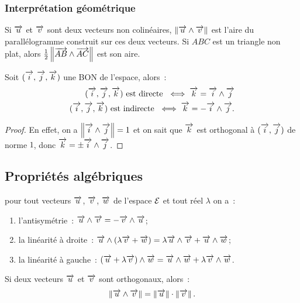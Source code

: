 \subsubsection{Interprétation géométrique}

Si \(\vu\) et \(\vv\) sont deux vecteurs non colinéaires, 
\(\norme{\vu\wedge\vv}\) est l'aire du parallélogramme construit sur ces deux 
vecteurs. Si \(ABC\) est un triangle non plat, alors 
\(\frac{1}{2}\norme{\vect{AB}\wedge\vect{AC}}\) est son aire.
\begin{prop}
  Soit \(\bondtrois\) une BON de l'espace, alors~:
  \begin{align}
    \bondtrois\text{~est directe~}\iff \vk = \vi\wedge\vj\\
    \bondtrois\text{~est indirecte~}\iff \vk = -\vi\wedge\vj.
  \end{align}
\end{prop}

\begin{proof}
  En effet, on a \(\norme{\vi\wedge\vj} = 1\) et on sait que \(\vk\) est 
  orthogonal à \((\vi, \vj)\) de norme \(1\), donc \(\vk = \pm\vi\wedge\vj\).
\end{proof}

\subsection{Propriétés algébriques}

\begin{prop}
  pour tout vecteurs \(\vu\), \(\vv\), \(\vw\) de l'espace \(\E\) et tout réel 
  \(\lambda\) on a~:
  \begin{enumerate}
    \item l'antisymétrie~: \(\vu\wedge\vv = -\vv\wedge\vu\);
    \item la linéarité à droite~: \(\vu\wedge(\lambda\vv + \vw) = 
      \lambda\vu\wedge\vv + \vu\wedge\vw\);
    \item la linéarité à gauche~: \((\vu + \lambda\vv)\wedge\vw = \vu\wedge\vw 
      + \lambda\vv\wedge\vw\).
  \end{enumerate}
\end{prop}

\begin{prop}
  Si deux vecteurs \(\vu\) et \(\vv\) sont orthogonaux, alors~:
  \begin{equation}
    \norme{\vu\wedge\vv} = \norme{\vu}\cdot\norme{\vv}.
  \end{equation}
\end{prop}

